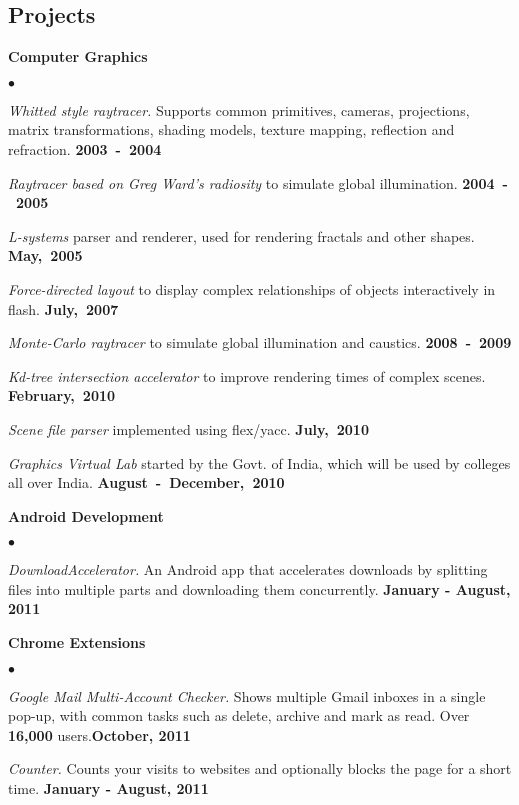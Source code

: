 \documentclass[margin,line]{res}
\newenvironment{list2}{
  \begin{list}{$\bullet$}{%
      \setlength{\itemsep}{0in}
      \setlength{\parsep}{0in} \setlength{\parskip}{0in}
      \setlength{\topsep}{0in} \setlength{\partopsep}{0in} 
      \setlength{\leftmargin}{0.2in}}}{\end{list}}
\begin{document}
\begin{resume}
\section{\sc Projects}
{\bf Computer Graphics}
\begin{list2}
\item {\em Whitted style raytracer.} Supports common primitives, cameras, projections,
matrix transformations, shading models, texture mapping, reflection and refraction. \hfill {\bf 2003~-~2004}
\item {\em Raytracer based on Greg Ward's radiosity} to simulate global illumination.  \hfill {\bf 2004~-~2005}
\item {\em L-systems} parser and renderer, used for rendering fractals and other shapes. \hfill {\bf May,~2005}
\item {\em Force-directed layout} to display complex relationships of objects interactively in flash. \hfill {\bf July,~2007}
\item {\em Monte-Carlo raytracer} to simulate global illumination and caustics. \hfill {\bf 2008~-~2009}
\item {\em Kd-tree intersection accelerator} to improve rendering times of complex scenes. \hfill {\bf February,~2010}
\item {\em Scene file parser} implemented using flex/yacc. \hfill {\bf July,~2010}
\item {\em Graphics Virtual Lab} started by the Govt. of India, which will be used by colleges all over India. \hfill {\bf August~-~December,~2010}
\end{list2}

{\bf Android Development}
\begin{list2}
\item {\em DownloadAccelerator.} An Android app that accelerates downloads by splitting files into multiple parts and downloading them concurrently. \hfill {\bf January - August, 2011}
\end{list2}

{\bf Chrome Extensions}
\begin{list2}
\item {\em Google Mail Multi-Account Checker.} Shows multiple Gmail inboxes in a single pop-up, with common tasks such as delete, archive and mark as read. Over {\bf 16,000} users.\hfill {\bf October, 2011}
\item {\em Counter.} Counts your visits to websites and optionally blocks the page for a short time. \hfill {\bf January - August, 2011}
\end{list2}


\end{resume}
\end{document}
